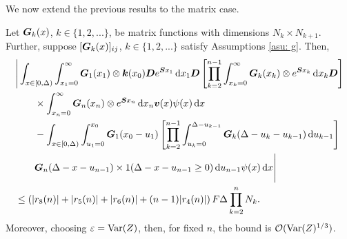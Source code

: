 %
%
We now extend the previous results to the matrix case.
\begin{lem}\label{lem: boobies2}
	Let \(\boldsymbol G_k(x)\), \(k\in\{1,2,...\}\), be matrix functions with dimensions \(N_k \times N_{k+1}\). Further, suppose \([\boldsymbol G_k(x)]_{ij}\), \(k\in\{1,2,...\}\) satisfy Assumptions \ref{asu: g}. Then, 
	\begin{align}
		&\Bigg| \int_{x\in[0,\Delta)} \int_{x_1=0}^\infty \boldsymbol G_1(x_1) \otimes \boldsymbol k(x_0) \boldsymbol D e^{\boldsymbol{S}x_1}\, \mathrm{d} x_1\boldsymbol D 
				\left[\prod_{k=2}^{n-1}\int_{x_k=0}^\infty \boldsymbol G_{k}(x_k) \otimes e^{\boldsymbol{S}x_k} \, \mathrm{d} x_k
		\boldsymbol D\right] \nonumber 
				\\&\qquad{}\times\int_{x_n=0}^\infty \boldsymbol G_{n}(x_n) \otimes e^{\boldsymbol{S}x_n} \, \mathrm{d} x_n {\boldsymbol v}(x) \psi(x)\, \mathrm{d} x \nonumber 
		\\&\qquad {}- \int_{x\in[0,\Delta)} \int_{u_1=0}^{x_0}\boldsymbol G_1(x_0 - u_1)
		\left[\prod_{k=2}^{n-1} \int_{u_k=0}^{\Delta-u_{k-1}} \boldsymbol {G}_{k}(\Delta-u_k-u_{k-1})\, \mathrm{d} u_{k-1}\right] \nonumber 
				\\&\qquad{} \boldsymbol G_{n}(\Delta - x-u_{n-1})
	 		\times1(\Delta-x-u_{n-1}\geq0)\, \mathrm{d} u_{n-1}\psi(x)\, \mathrm{d} x \Bigg| \nonumber
		\\&\leq \left(|r_8(n)|+|r_5(n)|+|r_6(n)| + (n-1)|r_4(n)|\right)F\Delta \prod_{k=2}^{n}N_{k}.\label{eqn: KAFnnmna22G}
	\end{align}
	Moreover, choosing \(\varepsilon=\mathrm{Var}(Z)\), then, for fixed \(n\), the bound is \(\mathcal O(\mathrm{Var}(Z)^{1/3})\). 
\end{lem}
